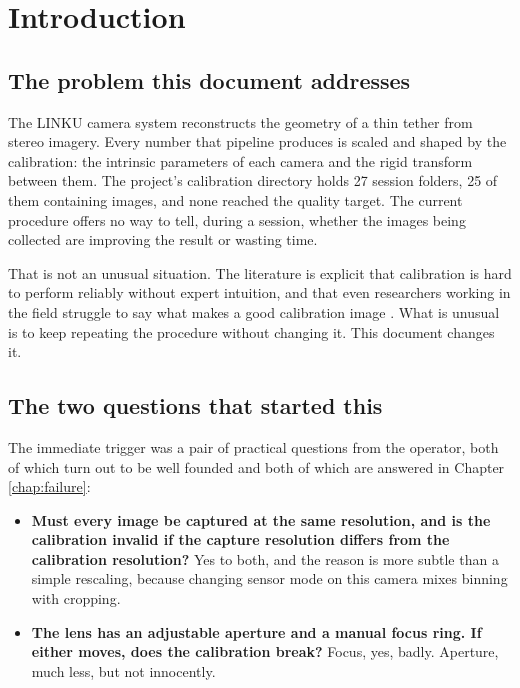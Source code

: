 \chapter*{Introduction}

\section*{The problem this document addresses}

The LINKU camera system reconstructs the geometry of a thin tether from stereo imagery. Every number that pipeline produces is scaled and shaped by the calibration: the intrinsic parameters of each camera and the rigid transform between them. The project's calibration directory holds 27 session folders, 25 of them containing images, and none reached the quality target. The current procedure offers no way to tell, during a session, whether the images being collected are improving the result or wasting time.

That is not an unusual situation. The literature is explicit that calibration is hard to perform reliably without expert intuition, and that even researchers working in the field struggle to say what makes a good calibration image \cite{rojtberg2018pose}. What is unusual is to keep repeating the procedure without changing it. This document changes it.

\section*{The two questions that started this}

The immediate trigger was a pair of practical questions from the operator, both of which turn out to be well founded and both of which are answered in Chapter \ref{chap:failure}:

\begin{itemize}
    \item \textbf{Must every image be captured at the same resolution, and is the calibration invalid if the capture resolution differs from the calibration resolution?} Yes to both, and the reason is more subtle than a simple rescaling, because changing sensor mode on this camera mixes binning with cropping.
    \item \textbf{The lens has an adjustable aperture and a manual focus ring. If either moves, does the calibration break?} Focus, yes, badly. Aperture, much less, but not innocently.
\end{itemize}

